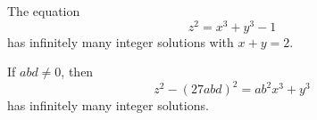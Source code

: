 \begin{proposition}
    The equation
\[
    z^2=x^3+y^3-1
\]
    has infinitely many integer solutions with $x+y=2$.
\end{proposition}

\begin{proposition}
    If $abd\ne0$, then
\[
    z^2-(27abd)^2=ab^2x^3+y^3
\]
    has infinitely many integer solutions.
\end{proposition}
